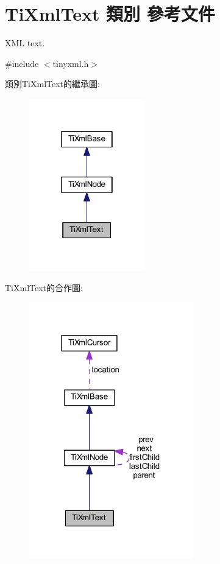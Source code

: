 \hypertarget{class_ti_xml_text}{}\section{Ti\+Xml\+Text 類別 參考文件}
\label{class_ti_xml_text}


X\+ML text.  




{\ttfamily \#include $<$tinyxml.\+h$>$}



類別\+Ti\+Xml\+Text的繼承圖\+:\nopagebreak
\begin{figure}[H]
\begin{center}
\leavevmode
\includegraphics[width=142pt]{class_ti_xml_text__inherit__graph}
\end{center}
\end{figure}


Ti\+Xml\+Text的合作圖\+:\nopagebreak
\begin{figure}[H]
\begin{center}
\leavevmode
\includegraphics[width=201pt]{class_ti_xml_text__coll__graph}
\end{center}
\end{figure}

